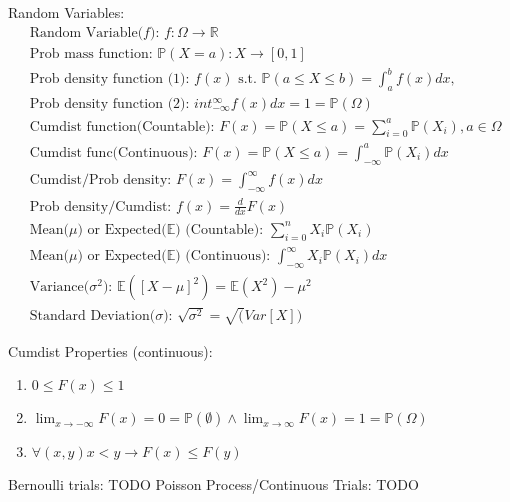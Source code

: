 \documentclass[12pt]{article}
\renewcommand{\=}[1]{\stackrel{#1}{=}} %
\theoremstyle{definition}
\theoremstyle{remark}
\begin{document}
Random Variables:
\begin{align*}
  &\textrm{Random Variable($f$): } f:\Omega\rightarrow \mathbb{R} \\
  &\textrm{Prob mass function: } \mathbb{P}(X=a):X\rightarrow
  [0,1]\\
  &\textrm{Prob density function (1): $f(x)$ s.t. } \mathbb{P}(a \leq X
  \leq b) = \int_a^bf(x)dx, \\
  &\textrm{Prob density function (2): } int_{-\infty}^{\infty}f(x)dx = 1 =
  \mathbb{P}(\Omega)\\ 
  &\textrm{Cumdist function(Countable): } F(x) = \mathbb{P}(X\leq a) =
  \sum_{i=0}^a\mathbb{P}(X_i), a\in\Omega \\
  &\textrm{Cumdist func(Continuous): } F(x) = \mathbb{P}(X\leq a) =
  \int_{-\infty}^a\mathbb{P}(X_i)dx \\
  &\textrm{Cumdist/Prob density: } F(x) = \int_{-\infty}^{\infty} f(x)dx \\
  &\textrm{Prob density/Cumdist: } f(x) = \frac{d}{dx}F(x) \\
  &\textrm{Mean($\mu$) or Expected($\mathbb{E}$) (Countable): }
  \sum_{i=0}^nX_i\mathbb{P}(X_i) \\
  &\textrm{Mean($\mu$) or Expected($\mathbb{E}$) (Continuous): } \int_{-\infty}^{\infty}X_i\mathbb{P}(X_i)dx \\
  &\textrm{Variance($\sigma^2$): } \mathbb{E}([X-\mu]^2) = \mathbb{E}(X^2)-\mu^2 \\
  &\textrm{Standard Deviation($\sigma$): } \sqrt{\sigma^2} = \sqrt(Var[X]) 
\end{align*}

Cumdist Properties (continuous):
\begin{enumerate}
\item $0 \leq F(x) \leq 1$
\item $ \lim_{x\rightarrow -\infty}F(x) = 0 = \mathbb{P}(\emptyset) \wedge
  \lim_{x\rightarrow \infty}F(x) = 1 = \mathbb{P}(\Omega)$
\item $\forall (x,y) x<y \rightarrow F(x) \leq F(y)$
\end{enumerate}


Bernoulli trials: TODO
Poisson Process/Continuous Trials: TODO
\end{document}
